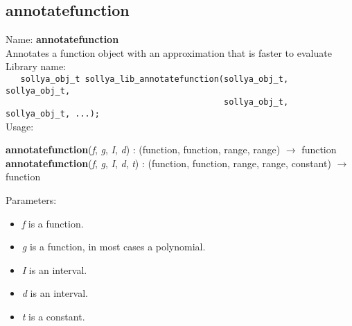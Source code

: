 \subsection{annotatefunction}
\label{labannotatefunction}
\noindent Name: \textbf{annotatefunction}\\
\phantom{aaa}Annotates a \sollya function object with an approximation that is faster to evaluate\\[0.2cm]
\noindent Library name:\\
\verb|   sollya_obj_t sollya_lib_annotatefunction(sollya_obj_t, sollya_obj_t, |\\
\verb|                                            sollya_obj_t, sollya_obj_t, ...);|\\[0.2cm]
\noindent Usage: 
\begin{center}
\textbf{annotatefunction}(\emph{f}, \emph{g}, \emph{I}, \emph{d}) : (\textsf{function}, \textsf{function}, \textsf{range}, \textsf{range}) $\rightarrow$ \textsf{function}\\
\textbf{annotatefunction}(\emph{f}, \emph{g}, \emph{I}, \emph{d}, \emph{t}) : (\textsf{function}, \textsf{function}, \textsf{range}, \textsf{range}, \textsf{constant}) $\rightarrow$ \textsf{function}\\
\end{center}
Parameters: 
\begin{itemize}
\item \emph{f} is a function.
\item \emph{g} is a function, in most cases a polynomial.
\item \emph{I} is an interval.
\item \emph{d} is an interval.
\item \emph{t} is a constant.
\end{itemize}
